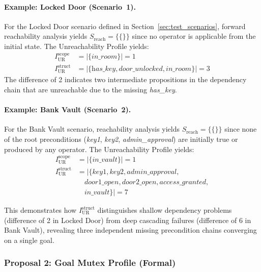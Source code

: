 \paragraph{Example: Locked Door (Scenario~1).} For the Locked Door scenario defined in Section~\ref{sec:test_scenarios}, forward reachability analysis yields $S_{\text{reach}} = \{\{\}\}$ since no operator is applicable from the initial state. The Unreachability Profile yields:
\begin{align*}
    I^{\text{scope}}_{\text{UR}}  & = |\{\textit{in\_room}\}| = 1                                             \\
    I^{\text{struct}}_{\text{UR}} & = |\{\textit{has\_key}, \textit{door\_unlocked}, \textit{in\_room}\}| = 3
\end{align*}
The difference of 2 indicates two intermediate propositions in the dependency chain that are unreachable due to the missing \textit{has\_key}.

\paragraph{Example: Bank Vault (Scenario~2).} For the Bank Vault scenario, reachability analysis yields $S_{\text{reach}} = \{\{\}\}$ since none of the root preconditions (\textit{key1}, \textit{key2}, \textit{admin\_approval}) are initially true or produced by any operator. The Unreachability Profile yields:
\begin{align*}
    I^{\text{scope}}_{\text{UR}}  & = |\{\textit{in\_vault}\}| = 1                                              \\
    I^{\text{struct}}_{\text{UR}} & = |\{\textit{key1}, \textit{key2}, \textit{admin\_approval},                \\
                                  & \quad \textit{door1\_open}, \textit{door2\_open}, \textit{access\_granted}, \\
                                  & \quad \textit{in\_vault}\}| = 7
\end{align*}

This demonstrates how $I^{\text{struct}}_{\text{UR}}$ distinguishes shallow dependency problems (difference of 2 in Locked Door) from deep cascading failures (difference of 6 in Bank Vault), revealing three independent missing precondition chains converging on a single goal.

\subsubsection{Proposal 2: Goal Mutex Profile (Formal)}

